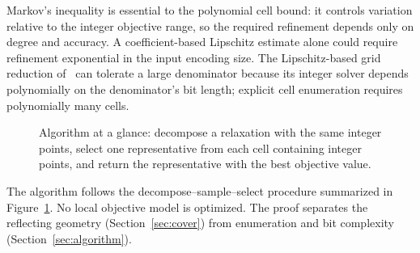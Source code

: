 \documentclass[final,5p,times,twocolumn]{elsarticle}
\theoremstyle{definition}\newtheorem{definition}{Definition}[section]
\theoremstyle{remark}\newtheorem{remark}[theorem]{Remark}
\begin{document}
Markov's inequality is essential to the polynomial cell bound: it controls variation relative to the integer objective range, so the required refinement depends only on degree and accuracy. A coefficient-based Lipschitz estimate alone could require refinement exponential in the input encoding size. The Lipschitz-based grid reduction of~\cite{DHKW08} can tolerate a large denominator because its integer solver depends polynomially on the denominator's bit length; explicit cell enumeration requires polynomially many cells.

\begin{figure}[t]
\centering
{}
\caption{Algorithm at a glance: decompose a relaxation with the same integer points, select one representative from each cell containing integer points, and return the representative with the best objective value.}\label{fig:overview}
\end{figure}

The algorithm follows the decompose--sample--select procedure summarized in Figure~\ref{fig:overview}. No local objective model is optimized. The proof separates the reflecting geometry (Section~\ref{sec:cover}) from enumeration and bit complexity (Section~\ref{sec:algorithm}).
\end{document}
